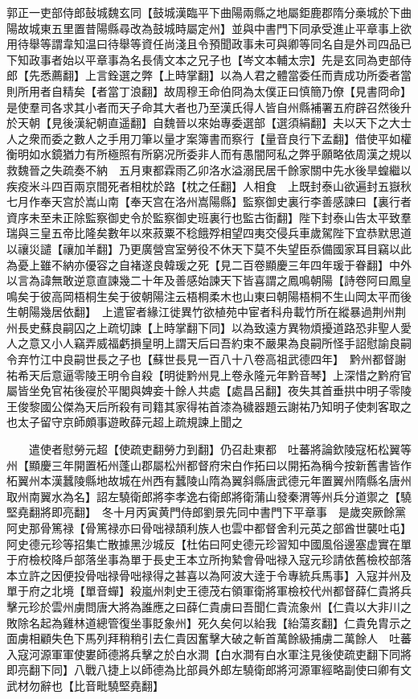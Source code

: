 郭正一吏部侍郎鼔城魏玄同【鼓城漢臨平下曲陽兩縣之地屬鉅鹿郡隋分槀城於下曲陽故城東五里置昔陽縣尋改為鼓城時屬定州】並與中書門下同承受進止平章事上欲用待舉等謂韋知温曰待舉等資任尚淺且令預聞政事未可與卿等同名自是外司四品已下知政事者始以平章事為名長倩文本之兄子也【岑文本輔太宗】先是玄同為吏部侍郎【先悉薦翻】上言銓選之弊【上時掌翻】以為人君之體當委任而責成功所委者當則所用者自精矣【者當丁浪翻】故周穆王命伯冏為太僕正曰慎簡乃僚【見書冏命】是使羣司各求其小者而天子命其大者也乃至漢氏得人皆自州縣補署五府辟召然後升於天朝【見後漢紀朝直遥翻】自魏晉以來始專委選部【選須絹翻】夫以天下之大士人之衆而委之數人之手用刀筆以量才案簿書而察行【量音良行下孟翻】借使平如權衡明如水鏡猶力有所極照有所窮况所委非人而有愚闇阿私之弊乎願略依周漢之規以救魏晉之失疏奏不納　五月東都霖雨乙卯洛水溢溺民居千餘家關中先水後旱蝗繼以疾疫米斗四百兩京間死者相枕於路【枕之任翻】人相食　上既封泰山欲遍封五嶽秋七月作奉天宫於嵩山南【奉天宫在洛州嵩陽縣】監察御史裏行李善感諫曰【裏行者資序未至未正除監察御史令於監察御史班裏行也監古衘翻】陛下封泰山告太平致羣瑞與三皇五帝比隆矣數年以來菽粟不稔餓殍相望四夷交侵兵車歲駕陛下宜恭默思道以禳災譴【禳加羊翻】乃更廣營宫室勞役不休天下莫不失望臣忝備國家耳目竊以此為憂上雖不納亦優容之自褚遂良韓瑗之死【見二百卷顯慶三年四年瑗于眷翻】中外以言為諱無敢逆意直諫幾二十年及善感始諫天下皆喜謂之鳳鳴朝陽【詩卷阿曰鳳皇鳴矣于彼高岡梧桐生矣于彼朝陽注云梧桐柔木也山東曰朝陽梧桐不生山岡太平而後生朝陽幾居依翻】　上遣宦者緣江徙異竹欲植苑中宦者科舟載竹所在縱暴過荆州荆州長史蘇良嗣囚之上疏切諫【上時掌翻下同】以為致遠方異物煩擾道路恐非聖人愛人之意又小人竊弄威福虧損皇明上謂天后曰吾約束不嚴果為良嗣所怪手詔慰諭良嗣令弃竹江中良嗣世長之子也【蘇世長見一百八十八卷高祖武德四年】　黔州都督謝祐希天后意逼零陵王明令自殺【明徙黔州見上卷永隆元年黔音琴】上深惜之黔府官屬皆坐免官祐後寑於平閣與婢妾十餘人共處【處昌呂翻】夜失其首垂拱中明子零陵王俊黎國公傑為天后所殺有司籍其家得祐首漆為穢器題云謝祐乃知明子使刺客取之也太子留守京師頗事遊畋薛元超上疏規諫上聞之

　　遣使者慰勞元超【使疏吏翻勞力到翻】仍召赴東都　吐蕃將論欽陵寇柘松翼等州【顯慶三年開置柘州蓬山郡屬松州都督府宋白作拓曰以開拓為稱今按新舊書皆作柘翼州本漢蠶陵縣地故城在州西有蠶陵山隋為翼斜縣唐武德元年置翼州隋縣名唐州取州南翼水為名】詔左驍衛郎將李孝逸右衛郎將衛蒲山發秦渭等州兵分道禦之【驍堅堯翻將即亮翻】　冬十月丙寅黄門侍郎劉景先同中書門下平章事　是歲突厥餘黨阿史那骨篤禄【骨篤禄亦曰骨咄禄頡利族人也雲中都督舍利元英之部酋世襲吐屯】阿史德元珍等招集亡散據黑沙城反【杜佑曰阿史德元珍習知中國風俗邊塞虚實在單于府檢校降戶部落坐事為單于長史王本立所拘縶會骨咄禄入寇元珍請依舊檢校部落本立許之因便投骨咄禄骨咄禄得之甚喜以為阿波大逹于令專統兵馬事】入寇并州及單于府之北境【單音蟬】殺嵐州刺史王德茂右領軍衛將軍檢校代州都督薛仁貴將兵擊元珍於雲州虜問唐大將為誰應之曰薛仁貴虜曰吾聞仁貴流象州【仁貴以大非川之敗除名起為雞林道總管復坐事貶象州】死久矣何以紿我【紿蕩亥翻】仁貴免胄示之面虜相顧失色下馬列拜稍稍引去仁貴因奮擊大破之斬首萬餘級捕虜二萬餘人　吐蕃入寇河源軍軍使婁師德將兵擊之於白水澗【白水澗有白水軍注見後使疏吏翻下同將即亮翻下同】八戰八捷上以師德為比部員外郎左驍衛郎將河源軍經略副使曰卿有文武材勿辭也【比音毗驍堅堯翻】

